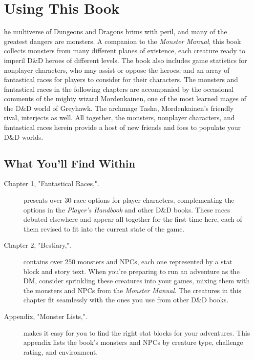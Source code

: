 \documentclass[10pt,a4paper,twoside,bg=print,twocolumn,openany,nodeprecatedcode]{dndbook}
\date{}
\begin{document}
\frontmatter
\tableofcontents
\mainmatter
\chapter{Using This Book}
he multiverse of Dungeons and Dragons brims with peril, and many of the greatest dangers are monsters. A companion to the \textit{Monster Manual}, this book collects monsters from many different planes of existence, each creature ready to imperil D\&D heroes of different levels. The book also includes game statistics for nonplayer characters, who may assist or oppose the heroes, and an array of fantastical races for players to consider for their characters. The monsters and fantastical races in the following chapters are accompanied by the occasional comments of the mighty wizard Mordenkainen, one of the most learned mages of the D\&D world of Greyhawk. The archmage Tasha, Mordenkainen's friendly rival, interjects as well. All together, the monsters, nonplayer characters, and fantastical races herein provide a host of new friends and foes to populate your D\&D worlds.


\section{What You'll Find Within}

\begin{description}
\item[Chapter 1, "Fantastical Races,".]
presents over 30 race options for player characters, complementing the options in the \textit{Player's Handbook} and other D&D books. These races debuted elsewhere and appear all together for the first time here, each of them revised to fit into the current state of the game.
\item[Chapter 2, "Bestiary,".]
contains over 250 monsters and NPCs, each one represented by a stat block and story text. When you're preparing to run an adventure as the DM, consider sprinkling these creatures into your games, mixing them with the monsters and NPCs from the \textit{Monster Manual}. The creatures in this chapter fit seamlessly with the ones you use from other D&D books.
\item[Appendix, "Monster Lists,".]
makes it easy for you to find the right stat blocks for your adventures. This appendix lists the book's monsters and NPCs by creature type, challenge rating, and environment.
\end{description}
\end{document}
